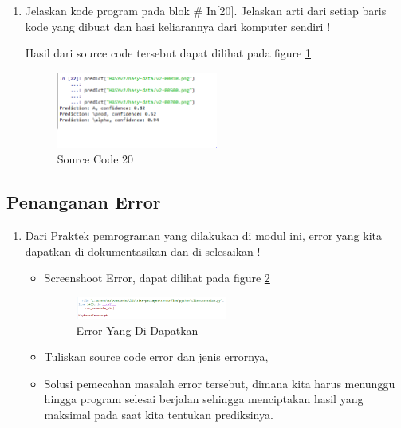 \begin{enumerate}
\item Jelaskan kode program pada blok \# In[20]. Jelaskan arti dari setiap baris kode yang dibuat dan hasi keliarannya dari komputer sendiri !
	
	\subitem Hasil dari source code tersebut dapat dilihat pada figure \ref{YNC7-28}
	\begin{figure}[!htbp!]
		\centerline{\includegraphics[width=0.5\textwidth]{figures/YN/Chapter7/YNC7-28.png}}
		\caption{Source Code 20}
		\label{YNC7-28}
	\end{figure}

\end{enumerate}

\subsection{Penanganan Error}
\begin{enumerate}

\item Dari Praktek pemrograman yang dilakukan di modul ini, error yang kita dapatkan di dokumentasikan dan di selesaikan !
	\begin{itemize}

	\item Screenshoot Error, dapat dilihat pada figure \ref{YNC7-29}
	
	\begin{figure}[!htbp!]
		\centerline{\includegraphics[width=0.5\textwidth]{figures/YN/Chapter7/YNC7-29.png}}
		\caption{Error Yang Di Dapatkan}
		\label{YNC7-29}
	\end{figure}

	\item Tuliskan source code error dan jenis errornya,
	

	\item Solusi pemecahan masalah error tersebut, dimana kita harus menunggu hingga program selesai berjalan sehingga menciptakan hasil yang maksimal pada saat kita tentukan prediksinya.
		
	\end{itemize}

\end{enumerate}
